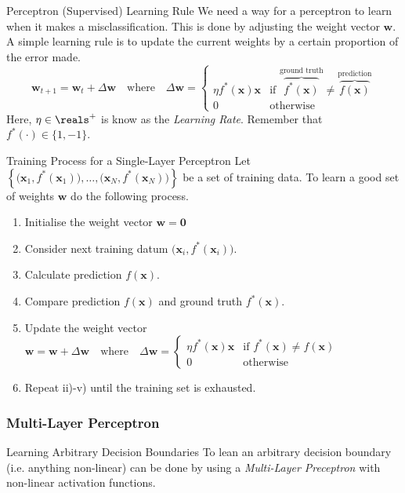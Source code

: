 \documentclass[11pt,a4paper]{article}
\begin{document}
\begin{proposition}{Perceptron (Supervised) Learning Rule}
  We need a way for a perceptron to learn when it makes a misclassification. This is done by adjusting the weight vector $\pmb{w}$. A simple learning rule is to update the current weights by a certain proportion of the error made.
  \[ \pmb{w}_{t+1}=\pmb{w}_t+\Delta\pmb{w}\quad\text{where}\quad\Delta\pmb{w}=\begin{cases}\eta f^*(\pmb{x})\pmb{x}&\text{if }\overbrace{f^*(\pmb{x})}^\text{ground truth}\neq \overbrace{f(\pmb{x})}^\text{prediction}\\0&\text{otherwise}\end{cases}\]
  Here, $\eta\in\reals^+$ is know as the \textit{Learning Rate}. Remember that $f^*(\cdot)\in\{1,-1\}$.
\end{proposition}

\begin{proposition}{Training Process for a Single-Layer Perceptron}
  Let $\left\{\big(\pmb{x}_1,f^*(\pmb{x}_1)\big),\dots,\big(\pmb{x}_N,f^*(\pmb{x}_N)\big)\right\}$ be a set of training data. To learn a good set of weights $\pmb{w}$ do the following process.
  \begin{enumerate}
    \item Initialise the weight vector $\pmb{w}=\pmb0$
    \item Consider next training datum $\big(\pmb{x}_i,f^*(\pmb{x}_i)\big)$.
    \item Calculate prediction $f(\pmb{x})$.
    \item Compare prediction $f(\pmb{x})$ and ground truth $f^*(\pmb{x})$.
    \item Update the weight vector $\pmb{w}=\pmb{w}+\Delta\pmb{w}\quad\text{where}\quad\Delta\pmb{w}=\begin{cases}\eta f^*(\pmb{x})\pmb{x}&\text{if }f^*(\pmb{x})\neq f(\pmb{x})\\0&\text{otherwise}\end{cases}$
    \item Repeat ii)-v) until the training set is exhausted.
  \end{enumerate}
\end{proposition}

\subsubsection{Multi-Layer Perceptron}

\begin{remark}{Learning Arbitrary Decision Boundaries}
  To lean an arbitrary decision boundary (i.e. anything non-linear) can be done by using a \textit{Multi-Layer Preceptron} with non-linear activation functions.
\end{remark}
\end{document}

